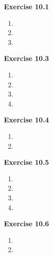 




\textbf{Exercise 10.1}
\begin{enumerate}
    \item 
    \item 
    \item 
\end{enumerate}

\textbf{Exercise 10.3}
\begin{enumerate}
    \item 
    \item 
    \item 
    \item 
\end{enumerate}

\textbf{Exercise 10.4}
\begin{enumerate}
    \item 
    \item 
\end{enumerate}

\textbf{Exercise 10.5}
\begin{enumerate}
    \item 
    \item 
    \item 
    \item 
\end{enumerate}

\textbf{Exercise 10.6}
\begin{enumerate}
    \item 
    \item 
\end{enumerate}


